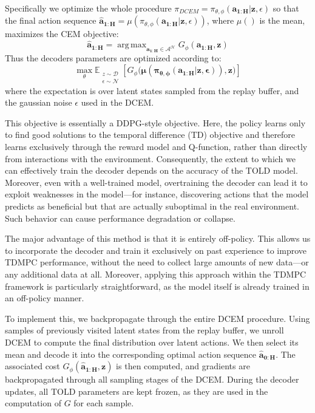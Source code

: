 \documentclass{article}
\DeclareMathOperator*{\argmax}{arg\,max}
\begin{document}
Specifically we optimize the whole procedure $\pi_{DCEM}=\pi_{\theta,\phi}(\mathbf{a_{1:H}}|\mathbf{z},\epsilon)$ so that the final action sequence $\mathbf{\hat{a}_{1:H}} = \mu(\pi_{\theta,\phi}(\mathbf{a_{1:H}|}\mathbf{z},\epsilon))$, where $\mu()$ is the mean, maximizes the CEM objective:
\begin{equation}\label{CEMopt}
\mathbf{\hat{a}_{1:H}}=  \argmax_{\mathbf{a_{1:H}\in \mathcal{A^H}}} G_\phi(\mathbf{a_{1:H},z})
\end{equation}
Thus the decoders parameters are optimized according to:
\begin{equation}
\max_\theta \mathbb{E}_{\substack{z \sim \mathcal{D} \\ \epsilon \sim \mathcal{N}}} [G_\phi(\mathbf{\mu(\pi_{\theta,\phi}(\mathbf{a_{1:H}|}\mathbf{z},\epsilon)),z)}]
\end{equation}
 where the expectation is over latent states sampled from the replay buffer, and the gaussian noise $\epsilon$ used in the DCEM.

This objective is essentially a DDPG-style objective.
Here, the policy learns only to find good solutions to the temporal difference (TD) objective and therefore learns exclusively through the reward model and Q-function, rather than directly from interactions with the environment. Consequently, the extent to which we can effectively train the decoder depends on the accuracy of the TOLD model. Moreover, even with a well-trained model, overtraining the decoder can lead it to exploit weaknesses in the model—for instance, discovering actions that the model predicts as beneficial but that are actually suboptimal in the real environment. Such behavior can cause performance degradation or collapse.

The major advantage of this method is that it is entirely off-policy. This allows us to incorporate the decoder and train it exclusively on past experience to improve TDMPC performance, without the need to collect large amounts of new data—or any additional data at all. Moreover, applying this approach within the TDMPC framework is particularly straightforward, as the model itself is already trained in an off-policy manner.

To implement this, we backpropagate through the entire DCEM procedure. Using samples of previously visited latent states from the replay buffer, we unroll DCEM to compute the final distribution over latent actions. We then select its mean and decode it into the corresponding optimal action sequence $\mathbf{\hat{a}_{0:H}}$. The associated cost $G_\phi(\mathbf{\hat{a}_{1:H}}, \mathbf{z})$ is then computed, and gradients are backpropagated through all sampling stages of the DCEM. During the decoder updates, all TOLD parameters are kept frozen, as they are used in the computation of $G$ for each sample.
\end{document}
